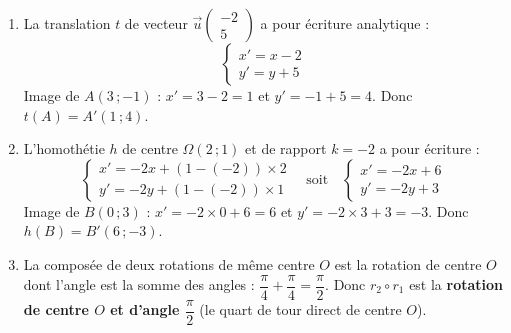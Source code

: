 \documentclass[11pt]{article}
\begin{document}
\begin{corrige}
\begin{enumerate}
\item La translation $t$ de vecteur $\vec{u}\begin{pmatrix} -2 \\ 5 \end{pmatrix}$ a pour écriture analytique :
\[ \begin{cases} x' = x - 2 \\ y' = y + 5 \end{cases} \]
Image de $A(3\,;-1)$ : $x' = 3 - 2 = 1$ et $y' = -1 + 5 = 4$. Donc $t(A) = A'(1\,;4)$.
\item L'homothétie $h$ de centre $\Omega(2\,;1)$ et de rapport $k = -2$ a pour écriture :
\[ \begin{cases} x' = -2x + (1-(-2)) \times 2 \\ y' = -2y + (1-(-2)) \times 1 \end{cases} \quad \text{soit} \quad \begin{cases} x' = -2x + 6 \\ y' = -2y + 3 \end{cases} \]
Image de $B(0\,;3)$ : $x' = -2 \times 0 + 6 = 6$ et $y' = -2 \times 3 + 3 = -3$. Donc $h(B) = B'(6\,;-3)$.
\item La composée de deux rotations de même centre $O$ est la rotation de centre $O$ dont l'angle est la somme des angles : $\dfrac{\pi}{4} + \dfrac{\pi}{4} = \dfrac{\pi}{2}$. Donc $r_2 \circ r_1$ est la \textbf{rotation de centre $O$ et d'angle $\dfrac{\pi}{2}$} (le quart de tour direct de centre $O$).
\end{enumerate}
\end{corrige}
\end{document}
